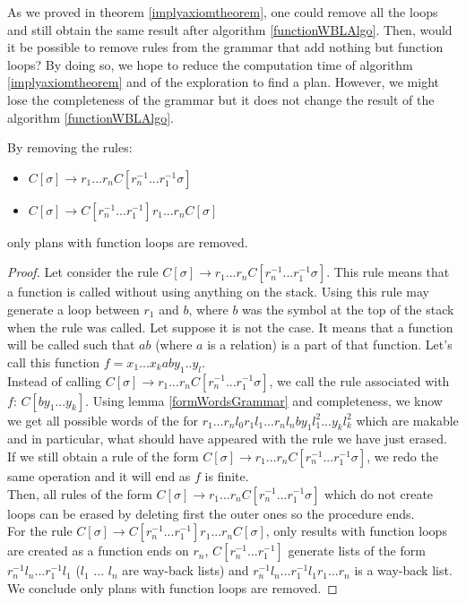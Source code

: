 \documentclass[10pt,a4paper,draft]{article}
\begin{document}
As we proved in theorem \ref{implyaxiomtheorem}, one could remove all the loops and still obtain the same result after algorithm \ref{functionWBLAlgo}. Then, would it be possible to remove rules from the grammar that add nothing but function loops? By doing so, we hope to reduce the computation time of algorithm \ref{implyaxiomtheorem} and of the exploration to find a plan. However, we might lose the completeness of the grammar but it does not change the result of the algorithm \ref{functionWBLAlgo}.\\

\begin{Theorem}
By removing the rules:
\begin{itemize}
 \item $C[\sigma] \rightarrow r_1 ... r_n C[r_{n}^{-1} ... r_1^{-1} \sigma]$
 \item $C[\sigma] \rightarrow C[r_{n}^{-1} ... r_1^{-1}] r_1 ... r_n C[\sigma]$
\end{itemize}
only plans with function loops are removed.
\end{Theorem}

\begin{proof}
Let consider the rule $C[\sigma] \rightarrow r_1 ... r_n C[r_{n}^{-1} ... r_1^{-1} \sigma]$. This rule means that a function is called without using anything on the stack. Using this rule may generate a loop between $r_1$ and $b$, where $b$ was the symbol at the top of the stack when the rule was called. Let suppose it is not the case. It means that a function will be called such that  $a b$ (where $a$ is a relation) is a part of that function. Let's call this function $f = x_1 ... x_k a b y_1 .. y_l$.\\
Instead of calling $C[\sigma] \rightarrow r_1 ... r_n C[r_{n}^{-1} ... r_1^{-1} \sigma]$, we call the rule associated with $f$: $C[b y_1 ... y_k]$. Using lemma \ref{formWordsGrammar} and completeness, we know we get all possible words of the for $r_1 ... r_n l_0 r_1 l_1 ... r_n l_n b y_1 l_1^2... y_k l_k^2$ which are makable and in particular, what should have appeared with the rule we have just erased. If we still obtain a rule of the form $C[\sigma] \rightarrow r_1 ... r_n C[r_{n}^{-1} ... r_1^{-1} \sigma]$, we redo the same operation and it will end as $f$ is finite.\\
Then, all rules of the form $C[\sigma] \rightarrow r_1 ... r_n C[r_{n}^{-1} ... r_1^{-1} \sigma]$ which do not create loops can be erased by deleting first the outer ones so the procedure ends.\\
For the rule $C[\sigma] \rightarrow C[r_{n}^{-1} ... r_1^{-1}] r_1 ... r_n C[\sigma]$, only results with function loops are created as a function ends on $r_n$, $C[r_{n}^{-1} ... r_1^{-1}]$ generate lists of the form $r_{n}^{-1} l_n ... r_1^{-1} l_1$ ($l_1$ ... $l_n$ are way-back lists) and $r_{n}^{-1} l_n ... r_1^{-1} l_1 r_1 ... r_n$ is a way-back list.\\
We conclude only plans with function loops are removed.
\end{proof}
\end{document}
